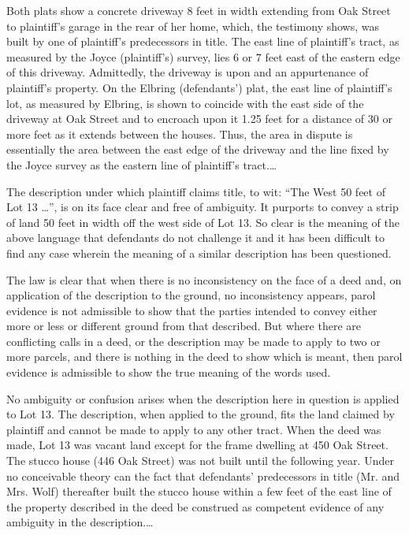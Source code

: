 Both plats show a concrete driveway 8 feet in width extending from Oak Street to
plaintiff's garage in the rear of her home, which, the testimony shows, was
built by one of plaintiff's predecessors in title. The east line of plaintiff's
tract, as measured by the Joyce (plaintiff's) survey, lies 6 or 7 feet east of
the eastern edge of this driveway. Admittedly, the driveway is upon and an
appurtenance of plaintiff's property. On the Elbring (defendants') plat, the
east line of plaintiff's lot, as measured by Elbring, is shown to coincide with
the east side of the driveway at Oak Street and to encroach upon it 1.25 feet
for a distance of 30 or more feet as it extends between the houses. Thus, the
area in dispute is essentially the area between the east edge of the driveway
and the line fixed by the Joyce survey as the eastern line of plaintiff's
tract.\ldots

The description under which plaintiff claims title, to wit: ``The West 50 feet
of
Lot 13 \dots'', is on its face clear and free of ambiguity. It purports to
convey a strip of land 50 feet in width off the west side of Lot 13. So clear
is the meaning of the above language that defendants do not challenge it and it
has been difficult to find any case wherein the meaning of a similar
description has been questioned. 

The law is clear that when there is no inconsistency on the face of a deed and,
on application of the description to the ground, no inconsistency appears,
parol evidence is not admissible to show that the parties intended to convey
either more or less or different ground from that described. But where there
are conflicting calls in a deed, or the description may be made to apply to two
or more parcels, and there is nothing in the deed to show which is meant, then
parol evidence is admissible to show the true meaning of the words used. 

No ambiguity or confusion arises when the description here in question is
applied to Lot 13. The description, when applied to the ground, fits the land
claimed by plaintiff and cannot be made to apply to any other tract. When the
deed was made, Lot 13 was vacant land except for the frame dwelling at 450 Oak
Street. The stucco house (446 Oak Street) was not built until the following
year. Under no conceivable theory can the fact that defendants' predecessors in
title (Mr. and Mrs. Wolf) thereafter built the stucco house within a few feet
of the east line of the property described in the deed be construed as
competent evidence of any ambiguity in the description.\ldots

